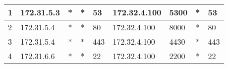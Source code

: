 \documentclass[a4paper, 11pt, oneside]{article}
\begin{document}
\begin{table}[H]
{\begin{tabular}{|l|lccl|clcl|}
1                                 & \multicolumn{1}{l|}{172.31.5.3}                                                   & \multicolumn{1}{c|}{*}                                                              & \multicolumn{1}{c|}{*}                                                                 & 53                                                                                       & \multicolumn{1}{l|}{172.32.4.100}                                                 & \multicolumn{1}{l|}{5300}                                                           & \multicolumn{1}{c|}{*}                                                                 & 53                                                                                       \\ \hline
2                                 & \multicolumn{1}{l|}{172.31.5.4}                                                   & \multicolumn{1}{c|}{*}                                                              & \multicolumn{1}{c|}{*}                                                                 & 80                                                                                       & \multicolumn{1}{l|}{172.32.4.100}                                                 & \multicolumn{1}{l|}{8000}                                                           & \multicolumn{1}{c|}{*}                                                                 & 80                                                                                       \\ \hline
3                                 & \multicolumn{1}{l|}{172.31.5.4}                                                   & \multicolumn{1}{c|}{*}                                                              & \multicolumn{1}{c|}{*}                                                                 & 443                                                                                      & \multicolumn{1}{l|}{172.32.4.100}                                                 & \multicolumn{1}{l|}{4430}                                                           & \multicolumn{1}{c|}{*}                                                                 & 443                                                                                      \\ \hline
4                                 & \multicolumn{1}{l|}{172.31.6.6}                                                   & \multicolumn{1}{c|}{*}                                                              & \multicolumn{1}{c|}{*}                                                                 & 22                                                                                       & \multicolumn{1}{l|}{172.32.4.100}                                                 & \multicolumn{1}{l|}{2200}                                                           & \multicolumn{1}{c|}{*}                                                                 & 22                                                                                       \\ \hline

\end{tabular}}
\end{table}
\end{document}
